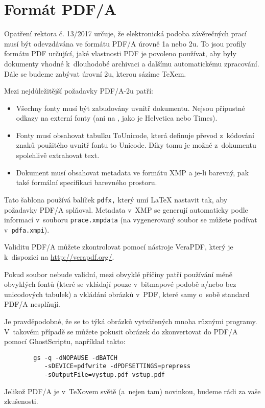 
\chapter{Formát PDF/A}

Opatření rektora č. 13/2017 určuje, že elektronická podoba závěrečných
prací musí být odevzdávána ve formátu PDF/A úrovně 1a nebo 2u. To jsou
profily formátu PDF určující, jaké vlastnosti PDF je povoleno používat,
aby byly dokumenty vhodné k~dlouhodobé archivaci a dalšímu automatickému
zpracování. Dále se budeme zabývat úrovní 2u, kterou sázíme \TeX{}em.

Mezi nejdůležitější požadavky PDF/A-2u patří:

\begin{itemize}

\item Všechny fonty musí být zabudovány uvnitř dokumentu. Nejsou přípustné
odkazy na externí fonty (ani na , jako je Helvetica nebo Times).

\item Fonty musí obsahovat tabulku ToUnicode, která definuje převod z~kódování
znaků použitého uvnitř fontu to Unicode. Díky tomu je možné z~dokumentu
spolehlivě extrahovat text.

\item Dokument musí obsahovat metadata ve formátu XMP a je-li barevný,
pak také formální specifikaci barevného prostoru.

\end{itemize}

Tato šablona používá balíček {\tt pdfx,} který umí \LaTeX{} nastavit tak,
aby požadavky PDF/A splňoval. Metadata v~XMP se generují automaticky podle
informací v~souboru {\tt prace.xmpdata} (na vygenerovaný soubor se můžete
podívat v~{\tt pdfa.xmpi}).

Validitu PDF/A můžete zkontrolovat pomocí nástroje VeraPDF, který je
k~dispozici na \url{http://verapdf.org/}.

Pokud soubor nebude validní, mezi obvyklé příčiny patří používání méně
obvyklých fontů (které se vkládají pouze v~bitmapové podobě a/nebo bez
unicodových tabulek) a vkládání obrázků v~PDF, které samy o~sobě standard
PDF/A nesplňují.

Je pravděpodobné, že se to týká obrázků vytvářených mnoha různými programy.
V~takovém případě se můžete pokusit obrázek do zkonvertovat do PDF/A pomocí
GhostScriptu, například takto:

\begin{verbatim}
        gs -q -dNOPAUSE -dBATCH
           -sDEVICE=pdfwrite -dPDFSETTINGS=prepress
           -sOutputFile=vystup.pdf vstup.pdf
\end{verbatim}

Jelikož PDF/A je v~\TeX{}ovem světě (a~nejen tam) novinkou, budeme rádi
za vaše zkušenosti.
